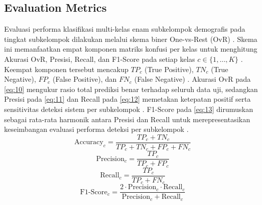 \subsection{Evaluation Metrics}
\label{sec:evaluation_metrics}

Evaluasi performa klasifikasi multi-kelas enam subkelompok demografis pada tingkat subkelompok dilakukan melalui skema biner One-vs-Rest (OvR) \cite{ref44}. Skema ini memanfaatkan empat komponen matriks konfusi per kelas untuk menghitung Akurasi OvR, Presisi, Recall, dan F1-Score pada setiap kelas $c \in \{1, \dots, K\}$ \cite{ref45}. Keempat komponen tersebut mencakup $TP_c$ (True Positive), $TN_c$ (True Negative), $FP_c$ (False Positive), dan $FN_c$ (False Negative) \cite{ref46}. Akurasi OvR pada \eqref{eq:10} mengukur rasio total prediksi benar terhadap seluruh data uji, sedangkan Presisi pada \eqref{eq:11} dan Recall pada \eqref{eq:12} memetakan ketepatan positif serta sensitivitas deteksi sistem per subkelompok \cite{ref47}. F1-Score pada \eqref{eq:13} dirumuskan sebagai rata-rata harmonik antara Presisi dan Recall untuk merepresentasikan keseimbangan evaluasi performa deteksi per subkelompok \cite{ref47}.
\begin{equation}
\text{Accuracy}_c = \frac{TP_c + TN_c}{TP_c + TN_c + FP_c + FN_c}
\label{eq:10}
\end{equation}
\begin{equation}
\text{Precision}_c = \frac{TP_c}{TP_c + FP_c}
\label{eq:11}
\end{equation}
\begin{equation}
\text{Recall}_c = \frac{TP_c}{TP_c + FN_c}
\label{eq:12}
\end{equation}
\begin{equation}
\text{F1-Score}_c = \frac{2 \cdot \text{Precision}_c \cdot \text{Recall}_c}{\text{Precision}_c + \text{Recall}_c}
\label{eq:13}
\end{equation}

